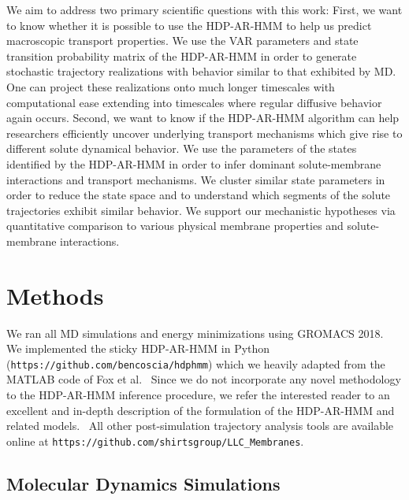 \documentclass[journal=jpcbfk,manuscript=article]{achemso}
\begin{document}
  We aim to address two primary scientific questions with this work:
  First, we want to know whether it is possible to use the HDP-AR-HMM to 
  help us predict macroscopic transport properties. We use the VAR parameters
  and state transition probability matrix of the HDP-AR-HMM in order to 
  generate stochastic trajectory realizations with behavior similar to that
  exhibited by MD. One can project these realizations onto much longer 
  timescales with computational ease extending into timescales where 
  regular diffusive behavior again occurs.
  Second, we want to know if the HDP-AR-HMM algorithm can help researchers
  efficiently uncover underlying transport mechanisms which give rise to different 
  solute dynamical behavior.
  We use the parameters of the states identified by the HDP-AR-HMM in order to infer 
  dominant solute-membrane interactions and transport mechanisms. We cluster similar 
  state parameters in order to reduce the state space and to understand which segments 
  of the solute trajectories exhibit similar behavior. We support our mechanistic 
  hypotheses via quantitative comparison to various physical membrane properties and
  solute-membrane interactions.
  
  \section{Methods}
    
  We ran all MD simulations and energy minimizations using GROMACS 2018.~\cite{bekker_gromacs:_1993,berendsen_gromacs:_1995,van_der_spoel_gromacs:_2005,hess_gromacs_2008}  
  We implemented the sticky HDP-AR-HMM in Python 
  (\texttt{https://github.com/bencoscia/hdphmm}) which we heavily adapted from
  the MATLAB code of Fox et al.~\cite{fox_nonparametric_2009} Since we do not incorporate
  any novel methodology to the HDP-AR-HMM inference procedure, we refer the 
  interested reader to an excellent and in-depth description of the formulation of
  the HDP-AR-HMM and related models.~\cite{fox_bayesian_2010} 
  All other post-simulation trajectory analysis tools are available online at
  \texttt{https://github.com/shirtsgroup/LLC\_Membranes}.

  \subsection{Molecular Dynamics Simulations}
\end{document}
